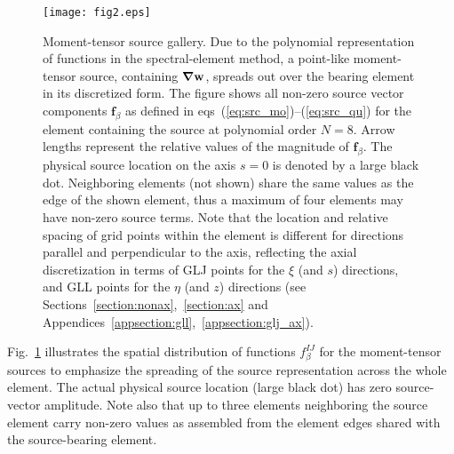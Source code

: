\documentclass[11pt,letter,fleqn,english,notitlepage]{article}
\newcommand{\bdel}{\mbox{\boldmath $\bf \nabla$}}
\begin{document}
\begin{figure}[htb!]
\begin{center}
\texttt{[image: fig2.eps]}
\caption{Moment-tensor source gallery. Due to the polynomial representation of 
functions in the spectral-element method, a point-like moment-tensor source,
containing $\bdel\mathbf{w}$, spreads out over the bearing 
element in its discretized form. The figure shows all non-zero source vector 
components $\mathbf{f}_\beta$ as defined in 
eqs~(\ref{eq:src_mo})--(\ref{eq:src_qu}) for 
the element containing the source at polynomial order $N=8$. 
Arrow lengths represent the relative values of the magnitude of 
$\mathbf{f}_\beta$. The physical source location on the axis $s=0$ is denoted 
by a large black dot. Neighboring elements (not shown) share 
the same values as the edge of the shown element, thus a maximum of four 
elements may have non-zero source terms. Note that the location and relative 
spacing of grid points within the element is different for directions 
parallel and perpendicular to the axis, reflecting the axial discretization in
terms of GLJ points for the $\xi$ (and $s$) directions, and GLL points for the 
$\eta$ (and $z$) directions
(see Sections~\ref{section:nonax},~\ref{section:ax} and 
Appendices~\ref{appsection:gll},~\ref{appsection:glj_ax}).}
\label{fig2}
\end{center}
\end{figure}
%
Fig.~\ref{fig2} illustrates the spatial distribution of functions 
$f^{IJ}_\beta$ for the moment-tensor sources to emphasize the spreading of 
the source representation across the whole element. 
The actual physical source location (large black dot) has zero
source-vector amplitude. Note also that up to three elements neighboring the 
source element carry non-zero values as assembled from the element edges 
shared with the source-bearing element. 
%
\end{document}
